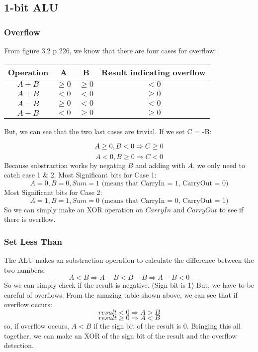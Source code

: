 \documentclass[11pt,a4paper]{article}
\begin{document}

\subsection*{1-bit ALU} %
\label{sub:1-bit_ALU}

\subsubsection*{Overflow}

From figure 3.2 p 226, we know that there are four cases for overflow:
\begin{table}[htb!]
    \centering
    \begin{tabular}{| c | c | c | c |}
        Operation & A & B & Result indicating overflow \\ \hline
        $A + B$ & $\geq 0$ & $\geq 0$ & $< 0$ \\
        $A + B$ & $< 0$ & $< 0$ & $\geq 0$ \\
        $A - B$ & $\geq 0$ & $< 0$ & $< 0$ \\
        $A - B$ & $< 0$ & $\geq 0$ & $\geq 0$ \\
    \end{tabular}
\end{table}

But, we can see that the two last cases are trivial. If we set C = -B:

\[
    A \geq 0, B < 0 \Rightarrow C \geq 0 \\
\]
\[
    A < 0, B \geq 0 \Rightarrow C < 0
\]
Because substraction works by negating $B$ and adding with $A$, we only need to
catch case 1 \& 2. Most Significant bits for Case 1:
\[
    A = 0, B = 0, Sum = 1 \text{ (means that CarryIn = 1, CarryOut = 0)}
\]
Most Significant bits for Case 2:
\[
    A = 1, B = 1, Sum = 0 \text{ (means that CarryIn = 0, CarryOut = 1)}
\]
So we can simply make an XOR operation on $CarryIn$ and $CarryOut$ to see if
there is overflow.

\subsubsection*{Set Less Than}
The ALU makes an substraction operation to calculate the difference between the
two numbers.
\[
    A < B \Rightarrow A - B < B - B \Rightarrow A - B < 0
\]
So we can simply check if the result is negative. (Sign bit is 1) But, we have
to be careful of overflows. From the amazing table shown above, we can see that
if overflow occurs:
\[
    result < 0 \Rightarrow A > B
\]
\[
    result \geq 0 \Rightarrow A < B
\]
so, if overflow occurs, $A < B$ if the sign bit of the result is 0. Bringing
this all together, we can make an XOR of the sign bit of the result and the
overflow detection.
\end{document}
